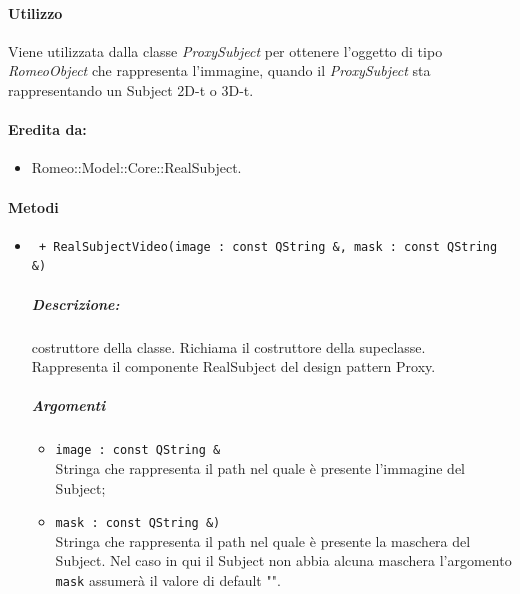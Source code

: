 \paragraph{Utilizzo \\}
Viene utilizzata dalla classe \textsl{ProxySubject} per ottenere l'oggetto di tipo \textsl{RomeoObject} che rappresenta l'immagine, quando il \textsl{ProxySubject} sta rappresentando un Subject\g{} 2D-t o 3D-t.
			

\paragraph{Eredita da:}
\begin{itemize}
	\item Romeo::Model::Core::RealSubject.
\end{itemize}

\paragraph{Metodi \\}
\begin{itemize}
		\item \color{blue}\verb! + RealSubjectVideo(image : const QString &, mask : const QString &)!
		\color{black}
		\subparagraph{Descrizione:} costruttore della classe. Richiama il costruttore della supeclasse.
		\\Rappresenta il componente RealSubject del design pattern\g{} Proxy.
		
		\subparagraph{Argomenti}
			\begin{itemize}
				\item \color{RoyalPurple}\verb!image : const QString &!\\
				\color{black}Stringa che rappresenta il path nel quale è presente l'immagine del Subject\g{};
				
				\item \color{RoyalPurple}\verb!mask : const QString &)!\\
				\color{black}Stringa che rappresenta il path nel quale è presente la maschera del Subject\g{}.
				Nel caso in qui il Subject\g{} non abbia alcuna maschera l'argomento \verb!mask! assumerà il valore di default "".
			\end{itemize}
	\end{itemize}

\pagebreak
\color{black}
